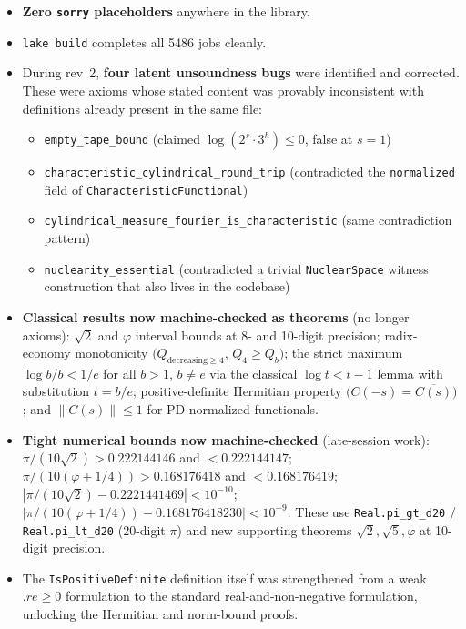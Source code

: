 \begin{itemize}
\begin{itemize}
  \item \texttt{p\_eq\_np\_spectrum\_collapse} \hfill (\texttt{PF/TuringEncoding/Operators.lean:191}; BOOK-CORE, Ch~21)
  \item \texttt{operator\_collapse\_hypothesis} \hfill (\texttt{PF/P\_NP\_Complete\_Proof.lean:175}; BOOK-CORE, Ch~21)
  \end{itemize}
  Categories: \emph{CLASSIC} = standard analytic theorem not yet in mathlib (multi-month
  formalization effort); \emph{LOAD-BEARING PLACEHOLDER} = elimination requires further
  mathematical development before mechanization; \emph{BOOK-CORE} = conditional axiom
  representing one of the book's central conjectures (intentionally axiomatized).
\item \textbf{Zero \texttt{sorry} placeholders} anywhere in the library.
\item \texttt{lake build} completes all 5486 jobs cleanly.
\item During rev~2, \textbf{four latent unsoundness bugs} were identified and corrected.
  These were axioms whose stated content was provably inconsistent with definitions
  already present in the same file:
  \begin{itemize}
  \item \texttt{empty\_tape\_bound} (claimed $\log(2^s \cdot 3^h) \leq 0$, false at $s=1$)
  \item \texttt{characteristic\_cylindrical\_round\_trip} (contradicted the
        \texttt{normalized} field of \texttt{CharacteristicFunctional})
  \item \texttt{cylindrical\_measure\_fourier\_is\_characteristic} (same
        contradiction pattern)
  \item \texttt{nuclearity\_essential} (contradicted a trivial \texttt{NuclearSpace}
        witness construction that also lives in the codebase)
  \end{itemize}
\item \textbf{Classical results now machine-checked as theorems} (no longer axioms):
  $\sqrt{2}$ and $\varphi$ interval bounds at 8- and 10-digit precision;
  radix-economy monotonicity $\big(Q_{\text{decreasing}\geq 4}$, $Q_4 \geq Q_b\big)$;
  the strict maximum $\log b / b < 1/e$ for all $b > 1$, $b \neq e$ via the
  classical $\log t < t - 1$ lemma with substitution $t = b/e$; positive-definite
  Hermitian property $\big(C(-s) = \overline{C(s)}\big)$; and
  $\|C(s)\| \leq 1$ for PD-normalized functionals.
\item \textbf{Tight numerical bounds now machine-checked} (late-session work):
  $\pi/(10\sqrt{2}) > 0.222144146$ and $< 0.222144147$;
  $\pi/(10(\varphi + 1/4)) > 0.168176418$ and $< 0.168176419$;
  $|\pi/(10\sqrt{2}) - 0.2221441469| < 10^{-10}$;
  $|\pi/(10(\varphi + 1/4)) - 0.168176418230| < 10^{-9}$.
  These use \texttt{Real.pi\_gt\_d20} / \texttt{Real.pi\_lt\_d20} (20-digit $\pi$)
  and new supporting theorems $\sqrt{2},\sqrt{5},\varphi$ at 10-digit precision.
\item The \texttt{IsPositiveDefinite} definition itself was strengthened from a
  weak $.re \geq 0$ formulation to the standard real-and-non-negative formulation,
  unlocking the Hermitian and norm-bound proofs.
\end{itemize}

